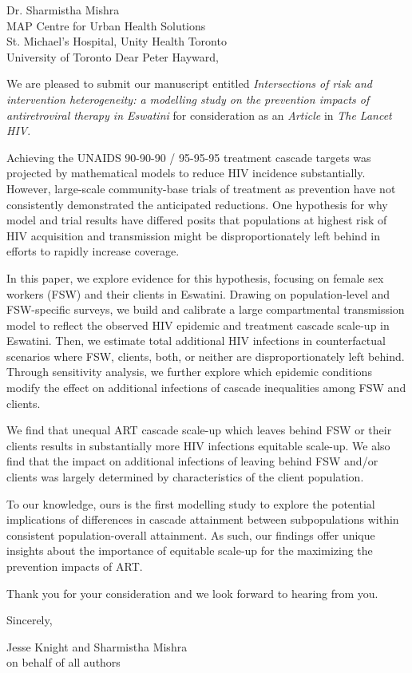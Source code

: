 \address{
  Peter Hayward\\
  Editor-in-Chief\\
  The Lancet HIV
}{Dr. Sharmistha Mishra\\
  MAP Centre for Urban Health Solutions\\
  St. Michael's Hospital, Unity Health Toronto\\
  University of Toronto}
Dear Peter Hayward,
\par
We are pleased to submit our manuscript entitled
\emph{Intersections of risk and intervention heterogeneity:
  a modelling study on the prevention impacts of antiretroviral therapy in Eswatini}
for consideration as an \emph{Article} in \emph{The Lancet HIV}.
\par
Achieving the UNAIDS 90-90-90 / 95-95-95 treatment cascade targets
was projected by mathematical models to reduce HIV incidence substantially.
However, large-scale community-base trials of treatment as prevention
have not consistently demonstrated the anticipated reductions.
One hypothesis for why model and trial results have differed posits that
populations at highest risk of HIV acquisition and transmission might be
disproportionately left behind in efforts to rapidly increase coverage.
\par
In this paper, we explore evidence for this hypothesis,
focusing on female sex workers (FSW) and their clients in Eswatini.
Drawing on population-level and FSW-specific surveys,
we build and calibrate a large compartmental transmission model
to reflect the observed HIV epidemic and treatment cascade scale-up in Eswatini.
Then, we estimate total additional HIV infections in counterfactual scenarios where
FSW, clients, both, or neither are disproportionately left behind.
Through sensitivity analysis, we further explore which epidemic conditions modify
the effect on additional infections of cascade inequalities among FSW and clients.
\par
We find that unequal ART cascade scale-up which leaves behind FSW or their clients
results in substantially more HIV infections \vs equitable scale-up.
We also find that the impact on additional infections of
leaving behind FSW and/or clients was largely determined by
characteristics of the client population.
\par
To our knowledge, ours is the first modelling study to explore
the potential implications of differences in cascade attainment between subpopulations
within consistent population-overall attainment.
As such, our findings offer unique insights about
the importance of equitable scale-up
for the maximizing the prevention impacts of ART.
\par
Thank you for your consideration and we look forward to hearing from you.
\medskip\par
Sincerely,
\par
Jesse Knight and Sharmistha Mishra\\
on behalf of all authors
